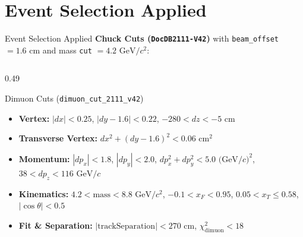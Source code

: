\documentclass[aspectratio=169, 10pt]{beamer}
\begin{document}
\section{Event Selection Applied}

\begin{frame}{Event Selection Applied}
\scriptsize
\textbf{Chuck Cuts (\texttt{DocDB2111-V42})} with \texttt{beam\_offset} $= 1.6\text{ cm}$ and mass \texttt{cut} $= 4.2\text{ GeV}/c^2$:
\vspace{-0.15cm}
\begin{columns}[T, onlytextwidth]
    \begin{column}{0.49\textwidth}
        \begin{block}{\scriptsize Dimuon Cuts (\texttt{dimuon\_cut\_2111\_v42})}
            \tiny
            \begin{itemize}
                \item \textbf{Vertex:} $|dx| < 0.25$, $|dy - 1.6| < 0.22$, $-280 < dz < -5\text{ cm}$
                \item \textbf{Transverse Vertex:} $dx^2 + (dy - 1.6)^2 < 0.06\text{ cm}^2$
                \item \textbf{Momentum:} $|dp_x| < 1.8$, $|dp_y| < 2.0$, $dp_x^2 + dp_y^2 < 5.0\text{ (GeV}/c)^2$, $38 < dp_z < 116\text{ GeV}/c$
                \item \textbf{Kinematics:} $4.2 < \text{mass} < 8.8\text{ GeV}/c^2$, $-0.1 < x_F < 0.95$, $0.05 < x_T \le 0.58$, $|\cos\theta| < 0.5$
                \item \textbf{Fit \& Separation:} $|\text{trackSeparation}| < 270\text{ cm}$, $\chi^2_{\text{dimuon}} < 18$
            \end{itemize}
        \end{block}


\end{column}
\end{columns}
\end{frame}
\end{document}
